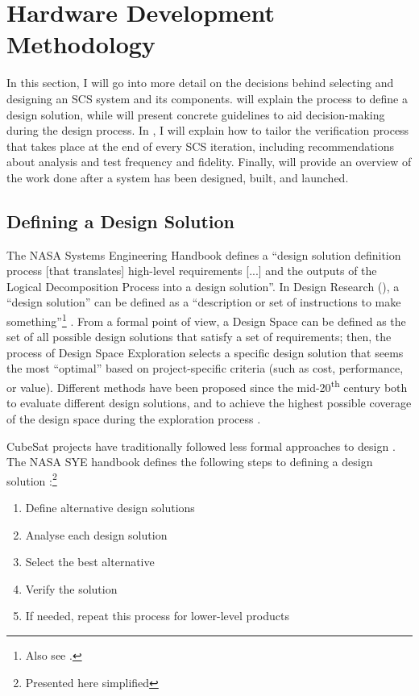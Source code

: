 \documentclass[a4paper,nobib,justified,final]{tufte-book}
\begin{document}
\FloatBarrier
\section{Hardware Development Methodology}
\label{sec:METHODOLOGY_hardwaredevelopment}
In this section, I will go into more detail on the decisions behind selecting and designing an \acs{SCS} system and its components.  will explain the process to define a design solution, while  will present concrete guidelines to aid decision-making during the design process. In , I will explain how to tailor the verification process that takes place at the end of every \acs{SCS} iteration, including recommendations about analysis and test frequency and fidelity. Finally,  will provide an overview of the work done after a system has been designed, built, and launched.

\subsection{Defining a Design Solution}
\label{sec:METHODOLOGY_defining_design_solution}

The \acs{NASA} Systems Engineering Handbook \autocite{sheaNASASystemsEngineering2020}
defines a ``design solution definition process [that translates] high-level requirements [...] and the outputs of the Logical Decomposition Process into a design solution''. In Design Research (), a ``design solution'' can be defined as a ``description or set of instructions to make something''\footnote{Also see .} \autocite{loveDefinitionDesign2015}.
From a formal point of view, a Design Space can be defined as the set of all possible design solutions that satisfy a set of requirements; then, the process of Design Space Exploration selects a specific design solution that seems the most ``optimal'' based on project-specific criteria (such as cost, performance, or value). Different methods have been proposed since the mid-20\textsuperscript{th} century both to evaluate different design solutions, and to achieve the highest possible coverage of the design space during the exploration process  \autocite{griesMethodsEvaluatingCovering2004}.

CubeSat projects have traditionally followed less formal approaches to design \autocite{sousaCubeSatDevelopmentFramework2021}. The \acs{NASA} \acs{SYE} handbook defines the following steps to defining a design solution \autocite[66]{sheaNASASystemsEngineering2020}:\footnote{Presented here simplified}
\begin{enumerate}[itemsep=-3ex]
	\item Define alternative design solutions
	\item Analyse each design solution
	\item Select the best alternative
	\item Verify the solution
	\item If needed, repeat this process for lower-level products
\end{enumerate}
\end{document}
